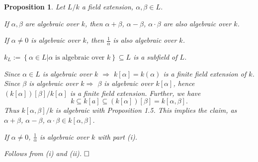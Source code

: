 \documentclass[11pt]{book}
\newtheorem{proposition}[theorem]{Proposition}
\theoremstyle{nonumberbreak}
\newenvironment{pr}[1][]{\ifthenelse{\equal{#1}{}}{\proof}{\proof[#1]}\rm}{\endproof}
\begin{document}
\begin{spacing}{1.3}
\begin{proposition} %
Let $L/k$ a field extension, $\alpha, \beta \in L$.
\begin{compactenum}
\item If $\alpha, \beta$ are algebraic over $k$, then $\alpha + \beta$, $\alpha - \beta$, $\alpha \cdot \beta$ are also algebraic over $k$.
\item If $\alpha \neq0$ is algebraic over $k$, then $\frac{1}{\alpha}$ is also algebraic over $k$.
\item $k_{L}:=\left\{\alpha \in L \big \vert \alpha \textrm{ is algebraic over } k\right\} \subseteq L$ is a subfield of $L$.
\end{compactenum}
\begin{pr}
\begin{compactenum}
\item Since $\alpha \in L$ is algebraic over $k$ $\Rightarrow$ $k[\alpha]=k(\alpha)$ is a finite field extension of $k$.
Since $\beta$ is algebraic over $k \Rightarrow$ $\beta$ is algebraic over $k[\alpha]$, hence $\left(k[\alpha]\right)[\beta]/k[\alpha]$ is a finite field extension.
Further, we have $$k \subseteq k[a] \subseteq \left(k[\alpha]\right)[\beta]=k[\alpha, \beta].$$ Thus $k[\alpha, \beta]/k$ is algebraic with Proposition 1.5.
This implies the claim, as $\alpha + \beta$, $\alpha-\beta$, $\alpha \cdot \beta \in k[\alpha, \beta]$.
\item If $\alpha \neq 0$, $\frac{1}{\alpha}$ is algebraic over $k$ with part (i).
\item Follows from (i) and (ii). $\hfill \Box$
\end{compactenum}
\end{pr}
\end{proposition}


\end{spacing}
\end{document}

